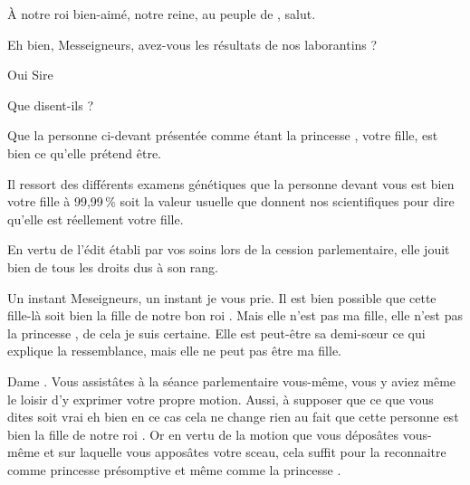 \scene

\StageDirII{\roi, \reine, \nobleOne, \nobleTwo, \nobleTree, \ela, \vladimir, \huissier, \greffier, \kingsgards}





\begin{drama}
  \nobleOnespeaks À notre roi bien-aimé, notre reine, au peuple de \campprincipal{}, salut.

  \roispeaks Eh bien, Messeigneurs, avez-vous les résultats de nos laborantins ?

  \nobleTwospeaks Oui Sire

  \roispeaks Que disent-ils ?

  \nobleTreespeaks Que la personne ci-devant présentée comme étant la princesse \princesse{}, votre fille, est bien ce qu’elle prétend être.


  \nobleOnespeaks Il ressort des différents examens génétiques que la personne devant vous est bien votre fille à 99,99\,\% soit la valeur usuelle que donnent nos scientifiques pour dire qu’elle est réellement votre fille.

  \nobleTwospeaks En vertu de l’édit établi par vos soins lors de la cession parlementaire, elle jouit bien de tous les droits dus à son rang.

  \reinespeaks {} Un instant Meseigneurs, un instant je vous prie. Il est bien possible que cette fille-là soit bien la fille de notre bon roi \roi. Mais elle n’est pas ma fille, elle n’est pas la princesse \princesse{}, de cela je suis certaine. Elle est peut-être sa demi-sœur ce qui explique la ressemblance, mais elle ne peut pas être ma fille.

  \nobleTreespeaks Dame \reine. Vous assistâtes à la séance parlementaire vous-même, vous y aviez même le loisir d’y exprimer votre propre motion. Aussi, à supposer que ce que vous dites soit vrai  eh bien en ce cas cela ne change rien au fait que cette personne est bien la fille de notre roi \roi. Or en vertu de la motion que vous déposâtes vous-même et sur laquelle vous apposâtes votre sceau, cela suffit pour la reconnaitre comme princesse présomptive et même comme la princesse \princesse{}.


\end{drama}
